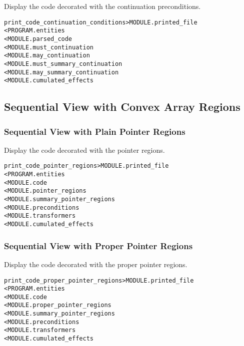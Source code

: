 \documentclass[a4paper]{report}
\newenvironment{PipsMake}{\begin{alltt}}{\end{alltt}}
\newenvironment{PipsPass}[1]{\label{pass:#1}}{}
\begin{document}
\begin{PipsPass}{print_code_continuation_conditions}
Display the code decorated with the continuation preconditions.
\end{PipsPass}

\begin{PipsMake}
print_code_continuation_conditions   > MODULE.printed_file
        < PROGRAM.entities
        < MODULE.parsed_code
        < MODULE.must_continuation
        < MODULE.may_continuation
        < MODULE.must_summary_continuation
        < MODULE.may_summary_continuation
        < MODULE.cumulated_effects
\end{PipsMake}


\subsection{Sequential View with Convex Array Regions}

\subsubsection{Sequential View with Plain Pointer Regions}
\label{sec:plain-pointer-regions}

\begin{PipsPass}{print_code_pointer_regions}
Display the code decorated with the pointer regions.
\end{PipsPass}

\begin{PipsMake}
print_code_pointer_regions              > MODULE.printed_file
        < PROGRAM.entities
        < MODULE.code
        < MODULE.pointer_regions
        < MODULE.summary_pointer_regions
        < MODULE.preconditions
        < MODULE.transformers
        < MODULE.cumulated_effects
\end{PipsMake}

\subsubsection{Sequential View with Proper Pointer Regions}

\begin{PipsPass}{print_code_proper_pointer_regions}
Display the code decorated with the proper pointer regions.
\end{PipsPass}

\begin{PipsMake}
print_code_proper_pointer_regions          > MODULE.printed_file
        < PROGRAM.entities
        < MODULE.code
        < MODULE.proper_pointer_regions
        < MODULE.summary_pointer_regions
        < MODULE.preconditions
        < MODULE.transformers
        < MODULE.cumulated_effects
\end{PipsMake}
\end{document}
